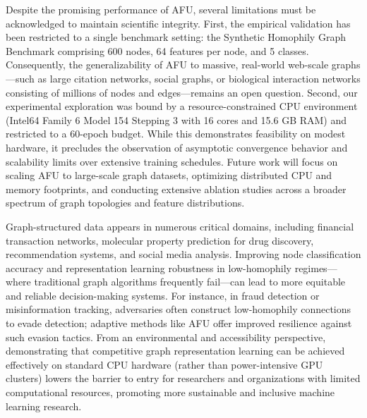 \documentclass[10pt,twocolumn]{article}
\newenvironment{limitations}{\par\medskip}{\par\medskip}
\newenvironment{broaderimpact}{\par\medskip}{\par\medskip}
\begin{document}
\begin{limitations}
Despite the promising performance of \textsc{AFU}, several limitations must be acknowledged to maintain scientific integrity. First, the empirical validation has been restricted to a single benchmark setting: the Synthetic Homophily Graph Benchmark comprising 600 nodes, 64 features per node, and 5 classes. Consequently, the generalizability of \textsc{AFU} to massive, real-world web-scale graphs—such as large citation networks, social graphs, or biological interaction networks consisting of millions of nodes and edges—remains an open question. Second, our experimental exploration was bound by a resource-constrained CPU environment (Intel64 Family 6 Model 154 Stepping 3 with 16 cores and 15.6 GB RAM) and restricted to a 60-epoch budget. While this demonstrates feasibility on modest hardware, it precludes the observation of asymptotic convergence behavior and scalability limits over extensive training schedules. Future work will focus on scaling \textsc{AFU} to large-scale graph datasets, optimizing distributed CPU and memory footprints, and conducting extensive ablation studies across a broader spectrum of graph topologies and feature distributions.
\end{limitations}

\begin{broaderimpact}
Graph-structured data appears in numerous critical domains, including financial transaction networks, molecular property prediction for drug discovery, recommendation systems, and social media analysis. Improving node classification accuracy and representation learning robustness in low-homophily regimes—where traditional graph algorithms frequently fail—can lead to more equitable and reliable decision-making systems. For instance, in fraud detection or misinformation tracking, adversaries often construct low-homophily connections to evade detection; adaptive methods like \textsc{AFU} offer improved resilience against such evasion tactics. From an environmental and accessibility perspective, demonstrating that competitive graph representation learning can be achieved effectively on standard CPU hardware (rather than power-intensive GPU clusters) lowers the barrier to entry for researchers and organizations with limited computational resources, promoting more sustainable and inclusive machine learning research.
\end{broaderimpact}
\end{document}
